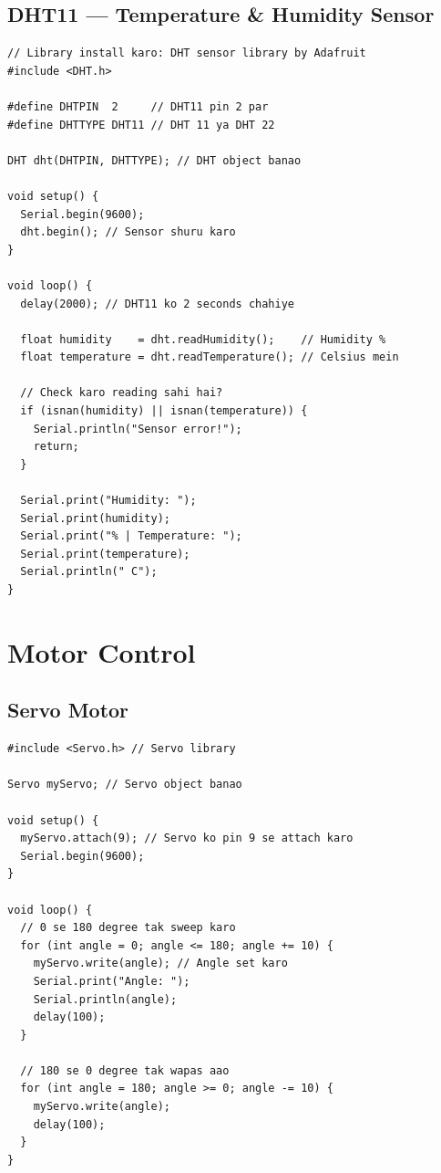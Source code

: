 \documentclass[12pt,a4paper]{article}
\begin{document}
\subsection{DHT11 — Temperature \& Humidity Sensor}

\begin{tcolorbox}[codebox=Example 18: Temp aur Humidity Read karna]
\begin{lstlisting}
// Library install karo: DHT sensor library by Adafruit
#include <DHT.h>

#define DHTPIN  2     // DHT11 pin 2 par
#define DHTTYPE DHT11 // DHT 11 ya DHT 22

DHT dht(DHTPIN, DHTTYPE); // DHT object banao

void setup() {
  Serial.begin(9600);
  dht.begin(); // Sensor shuru karo
}

void loop() {
  delay(2000); // DHT11 ko 2 seconds chahiye

  float humidity    = dht.readHumidity();    // Humidity %
  float temperature = dht.readTemperature(); // Celsius mein

  // Check karo reading sahi hai?
  if (isnan(humidity) || isnan(temperature)) {
    Serial.println("Sensor error!");
    return;
  }

  Serial.print("Humidity: ");
  Serial.print(humidity);
  Serial.print("% | Temperature: ");
  Serial.print(temperature);
  Serial.println(" C");
}
\end{lstlisting}
\end{tcolorbox}

\newpage

\section{Motor Control}

\subsection{Servo Motor}

\begin{tcolorbox}[codebox=Example 19: Servo Motor Control]
\begin{lstlisting}
#include <Servo.h> // Servo library

Servo myServo; // Servo object banao

void setup() {
  myServo.attach(9); // Servo ko pin 9 se attach karo
  Serial.begin(9600);
}

void loop() {
  // 0 se 180 degree tak sweep karo
  for (int angle = 0; angle <= 180; angle += 10) {
    myServo.write(angle); // Angle set karo
    Serial.print("Angle: ");
    Serial.println(angle);
    delay(100);
  }

  // 180 se 0 degree tak wapas aao
  for (int angle = 180; angle >= 0; angle -= 10) {
    myServo.write(angle);
    delay(100);
  }
}
\end{lstlisting}
\end{tcolorbox}
\end{document}
